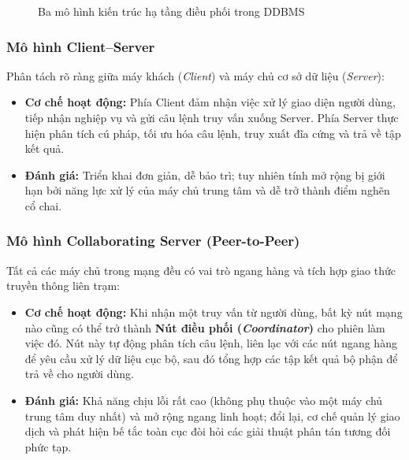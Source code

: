 \documentclass[12pt,a4paper]{report}
\begin{document}
\begin{figure}[!ht]
\vspace{-0.1cm}
\caption{Ba mô hình kiến trúc hạ tầng điều phối trong DDBMS}
\label{fig:ddbms_infrastructure_models}
\vspace{0.1cm}
\end{figure}

\subsubsection{Mô hình Client--Server}
Phân tách rõ ràng giữa máy khách (\textit{Client}) và máy chủ cơ sở dữ liệu (\textit{Server}):
\begin{itemize}[leftmargin=0.8cm, topsep=2pt, itemsep=1pt]
    \item \textbf{Cơ chế hoạt động:} Phía Client đảm nhận việc xử lý giao diện người dùng, tiếp nhận nghiệp vụ và gửi câu lệnh truy vấn xuống Server. Phía Server thực hiện phân tích cú pháp, tối ưu hóa câu lệnh, truy xuất đĩa cứng và trả về tập kết quả.
    \item \textbf{Đánh giá:} Triển khai đơn giản, dễ bảo trì; tuy nhiên tính mở rộng bị giới hạn bởi năng lực xử lý của máy chủ trung tâm và dễ trở thành điểm nghẽn cổ chai.
\end{itemize}

\subsubsection{Mô hình Collaborating Server (Peer-to-Peer)}
Tất cả các máy chủ trong mạng đều có vai trò ngang hàng và tích hợp giao thức truyền thông liên trạm:
\begin{itemize}[leftmargin=0.8cm, topsep=2pt, itemsep=1pt]
    \item \textbf{Cơ chế hoạt động:} Khi nhận một truy vấn từ người dùng, bất kỳ nút mạng nào cũng có thể trở thành \textbf{Nút điều phối (\textit{Coordinator})} cho phiên làm việc đó. Nút này tự động phân tích câu lệnh, liên lạc với các nút ngang hàng để yêu cầu xử lý dữ liệu cục bộ, sau đó tổng hợp các tập kết quả bộ phận để trả về cho người dùng.
    \item \textbf{Đánh giá:} Khả năng chịu lỗi rất cao (không phụ thuộc vào một máy chủ trung tâm duy nhất) và mở rộng ngang linh hoạt; đổi lại, cơ chế quản lý giao dịch và phát hiện bế tắc toàn cục đòi hỏi các giải thuật phân tán tương đối phức tạp.
\end{itemize}
\end{document}
